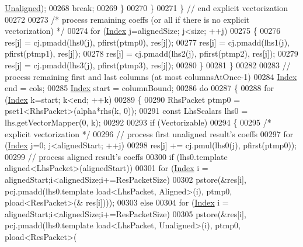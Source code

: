 \begin{DoxyCode}
{      \hyperlink{group__enums_gga45fe06e29902b7a2773de05ba27b47a1ac935220b4c844108e183ebe30a4d5204}{Unaligned});
00268             \textcolor{keywordflow}{break};
00269         \}
00270       \}
00271     \} \textcolor{comment}{// end explicit vectorization}
00272 
00273     \textcolor{comment}{/* process remaining coeffs (or all if there is no explicit vectorization) */}
00274     \textcolor{keywordflow}{for} (\hyperlink{namespace_eigen_a62e77e0933482dafde8fe197d9a2cfde}{Index} j=alignedSize; j<size; ++j)
00275     \{
00276       res[j] = cj.pmadd(lhs0(j), pfirst(ptmp0), res[j]);
00277       res[j] = cj.pmadd(lhs1(j), pfirst(ptmp1), res[j]);
00278       res[j] = cj.pmadd(lhs2(j), pfirst(ptmp2), res[j]);
00279       res[j] = cj.pmadd(lhs3(j), pfirst(ptmp3), res[j]);
00280     \}
00281   \}
00282 
00283   \textcolor{comment}{// process remaining first and last columns (at most columnsAtOnce-1)}
00284   \hyperlink{namespace_eigen_a62e77e0933482dafde8fe197d9a2cfde}{Index} end = cols;
00285   \hyperlink{namespace_eigen_a62e77e0933482dafde8fe197d9a2cfde}{Index} start = columnBound;
00286   \textcolor{keywordflow}{do}
00287   \{
00288     \textcolor{keywordflow}{for} (\hyperlink{namespace_eigen_a62e77e0933482dafde8fe197d9a2cfde}{Index} k=start; k<end; ++k)
00289     \{
00290       RhsPacket ptmp0 = pset1<RhsPacket>(alpha*rhs(k, 0));
00291       \textcolor{keyword}{const} LhsScalars lhs0 = lhs.getVectorMapper(0, k);
00292 
00293       \textcolor{keywordflow}{if} (Vectorizable)
00294       \{
00295         \textcolor{comment}{/* explicit vectorization */}
00296         \textcolor{comment}{// process first unaligned result's coeffs}
00297         \textcolor{keywordflow}{for} (\hyperlink{namespace_eigen_a62e77e0933482dafde8fe197d9a2cfde}{Index} j=0; j<alignedStart; ++j)
00298           res[j] += cj.pmul(lhs0(j), pfirst(ptmp0));
00299         \textcolor{comment}{// process aligned result's coeffs}
00300         \textcolor{keywordflow}{if} (lhs0.template aligned<LhsPacket>(alignedStart))
00301           \textcolor{keywordflow}{for} (\hyperlink{namespace_eigen_a62e77e0933482dafde8fe197d9a2cfde}{Index} i = alignedStart;i<alignedSize;i+=ResPacketSize)
00302             pstore(&res[i], pcj.pmadd(lhs0.template load<LhsPacket, Aligned>(i), ptmp0, pload<ResPacket>(&
      res[i])));
00303         \textcolor{keywordflow}{else}
00304           \textcolor{keywordflow}{for} (\hyperlink{namespace_eigen_a62e77e0933482dafde8fe197d9a2cfde}{Index} i = alignedStart;i<alignedSize;i+=ResPacketSize)
00305             pstore(&res[i], pcj.pmadd(lhs0.template load<LhsPacket, Unaligned>(i), ptmp0, pload<ResPacket>(
}
\end{DoxyCode}
